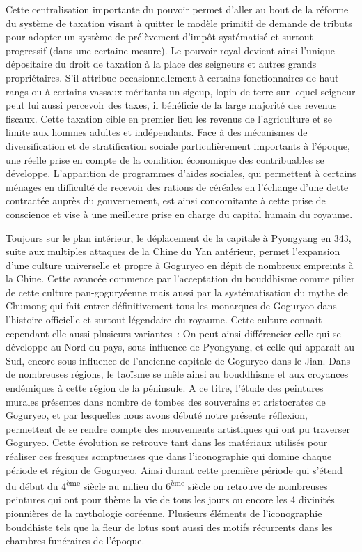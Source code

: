 \documentclass[11pt,a4paper]{article}
\begin{document}
Cette centralisation importante du pouvoir permet d'aller au bout de la réforme du système de taxation visant à quitter le modèle primitif de demande de tributs pour adopter un système de prélèvement d'impôt systématisé et surtout progressif (dans une certaine mesure). Le pouvoir royal devient ainsi l'unique dépositaire du droit de taxation à la place des seigneurs et autres grands propriétaires. S'il attribue occasionnellement à certains fonctionnaires de haut rangs ou à certains vassaux méritants un sigeup, lopin de terre sur lequel seigneur peut lui aussi percevoir des taxes, il bénéficie de la large majorité des revenus fiscaux. Cette taxation cible en premier lieu les revenus de l'agriculture et se limite aux hommes adultes et indépendants. Face à des mécanismes de diversification et de stratification sociale particulièrement importants à l'époque, une réelle prise en compte de la condition économique des contribuables se développe. L'apparition de programmes d'aides sociales, qui permettent à certains ménages en difficulté de recevoir des rations de céréales en l'échange d'une dette contractée auprès du gouvernement, est ainsi concomitante à cette prise de conscience et vise à une meilleure prise en charge du capital humain du royaume.

Toujours sur le plan intérieur, le déplacement de la capitale à Pyongyang en 343, suite aux multiples attaques de la Chine du Yan antérieur, permet l'expansion d'une culture universelle et propre à Goguryeo en dépit de nombreux empreints à la Chine. Cette avancée commence par l'acceptation du bouddhisme comme pilier de cette culture pan-goguryéenne mais aussi par la systématisation du mythe de Chumong qui fait entrer définitivement tous les monarques de Goguryeo dans l'histoire officielle et surtout légendaire du royaume. Cette culture connait cependant elle aussi plusieurs variantes~: On peut ainsi différencier celle qui se développe au Nord du pays, sous influence de Pyongyang, et celle qui apparait au Sud, encore sous influence de l'ancienne capitale de Goguryeo dans le Jian. Dans de nombreuses régions, le taoïsme se mêle ainsi au bouddhisme et aux croyances endémiques à cette région de la péninsule. A ce titre, l'étude des peintures murales présentes dans nombre de tombes des souverains et aristocrates de Goguryeo, et par lesquelles nous avons débuté notre présente réflexion, permettent de se rendre compte des mouvements artistiques qui ont pu traverser Goguryeo. Cette évolution se retrouve tant dans les matériaux utilisés pour réaliser ces fresques somptueuses que dans l'iconographie qui domine chaque période et région de Goguryeo. Ainsi durant cette première période qui s'étend du début du 4\textsuperscript{ème} siècle au milieu du 6\textsuperscript{ème} siècle on retrouve de nombreuses peintures qui ont pour thème la vie de tous les jours ou encore les 4 divinités pionnières de la mythologie coréenne. Plusieurs éléments de l'iconographie bouddhiste tels que la fleur de lotus sont aussi des motifs récurrents dans les chambres funéraires de l'époque.
\end{document}
